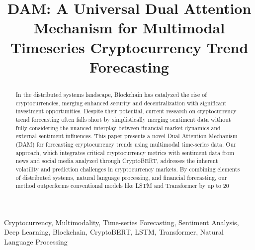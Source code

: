 
\title{DAM: A Universal Dual Attention Mechanism for Multimodal Timeseries Cryptocurrency Trend Forecasting



}
\maketitle



\begin{abstract}
In the distributed systems landscape, Blockchain has catalyzed the rise of cryptocurrencies, merging enhanced security and decentralization with significant investment opportunities. Despite their potential, current research on cryptocurrency trend forecasting often falls short by simplistically merging sentiment data without fully considering the nuanced interplay between financial market dynamics and external sentiment influences. This paper presents a novel Dual Attention Mechanism (DAM) for forecasting cryptocurrency trends using multimodal time-series data. Our approach, which integrates critical cryptocurrency metrics with sentiment data from news and social media analyzed through CryptoBERT, addresses the inherent volatility and prediction challenges in cryptocurrency markets. By combining elements of distributed systems, natural language processing, and financial forecasting, our method outperforms conventional models like LSTM and Transformer by up to 20\


\end{abstract}

\begin{IEEEkeywords}
Cryptocurrency,
Multimodality,
Time-series Forecasting,
Sentiment Analysis,
Deep Learning,
Blockchain, 
CryptoBERT, 
LSTM, 
Transformer,
Natural Language Processing
\end{IEEEkeywords}





